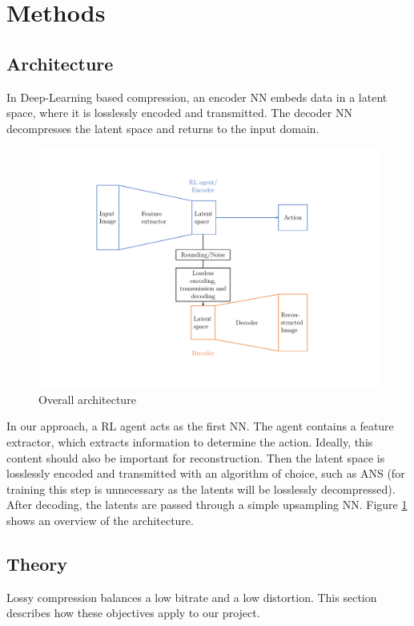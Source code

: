 \section{Methods}

\subsection{Architecture}\label{methods:Architecture}
    In Deep-Learning based compression, an encoder NN embeds data in a latent space, where it is losslessly encoded and transmitted. The decoder NN decompresses the latent space and returns to the input domain.

    \begin{figure}[H]
        \centering
        \includegraphics[width=\linewidth]{images/architecture.pdf}
        \setlength{\belowcaptionskip}{5pt}
        \caption{Overall architecture}
        \label{fig:Architecture}
    \end{figure}

    In our approach, a RL agent acts as the first
    NN. The agent contains a feature extractor, which
    extracts information to determine
    the action. Ideally, this content should also be important
    for reconstruction. Then the latent space is losslessly encoded and
    transmitted with an algorithm of choice, such as ANS (for training this
    step is unnecessary as the latents will be losslessly decompressed). After decoding, the latents are passed through a simple upsampling NN.
    Figure \ref{fig:Architecture} shows an overview of the architecture.

\subsection{Theory}
    Lossy compression balances a low bitrate and a low distortion.
    This section describes how these objectives apply to our project.

